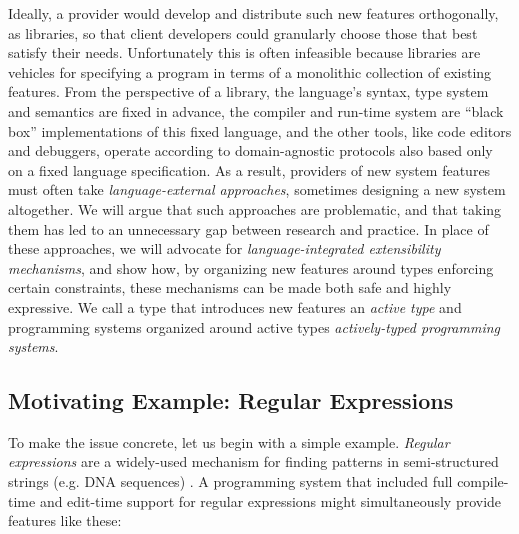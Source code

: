 Ideally, a provider would develop and distribute such new features orthogonally, as libraries, so that client developers could granularly choose those that best satisfy their needs. Unfortunately this is often infeasible because libraries are vehicles for specifying a program in terms of a monolithic collection of existing features. From the perspective of a library, the language's syntax, type system and semantics are fixed in advance, the compiler and run-time system are ``black box'' implementations of this fixed language, and the other tools, like code editors and debuggers, operate according to domain-agnostic protocols also based only on a fixed language specification. As a result, providers of new system features must often take \emph{language-external approaches}, sometimes designing a new system altogether. We will argue that such approaches are problematic, and that taking them has led to an unnecessary gap between research and practice. In place of these approaches, we will advocate for \emph{language-integrated extensibility mechanisms}, and show how, by organizing new features around {types} enforcing certain constraints, these mechanisms can be made both safe and highly expressive. We call a type that introduces new features an \emph{active type} and programming systems organized around active types \emph{actively-typed programming systems}.

\subsection{Motivating Example: Regular Expressions}\label{regex}
To make the issue concrete, let us begin with a simple example. \emph{Regular expressions} are a widely-used mechanism for finding patterns in semi-structured strings (e.g. DNA sequences) \cite{Thompson:1968:PTR:363347.363387}. A programming system that included full compile-time and edit-time support for regular expressions might simultaneously provide features like these:

